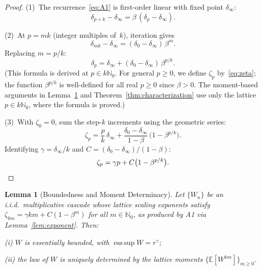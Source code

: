 \documentclass[12pt]{amsart}
\newtheorem{lemma}[theorem]{Lemma}
\theoremstyle{definition}
\theoremstyle{remark}
\DeclareMathOperator*{\esssup}{ess\,sup}
\begin{document}
\begin{proof}
(1)~The recurrence~\eqref{eq:A1} is first-order linear with fixed
point $\delta_\infty$:
\[
  \delta_{p+k} - \delta_\infty = \beta\,(\delta_p - \delta_\infty).
\]

(2)~At $p = mk$ (integer multiples of~$k$), iteration gives
\[
  \delta_{mk} - \delta_\infty
  = (\delta_0 - \delta_\infty)\,\beta^m.
\]
Replacing $m = p/k$:
\[
  \delta_p
  = \delta_\infty + (\delta_0 - \delta_\infty)\,\beta^{p/k}.
\]
(This formula is derived at $p \in k\mathbb{N}_0$.  For general $p
\geq 0$, we define $\zeta_p$ by~\eqref{eq:zeta}; the function
$\beta^{p/k}$ is well-defined for all real $p \geq 0$ since $\beta >
0$.  The moment-based arguments in Lemma~\ref{lem:determinacy} and
Theorem~\ref{thm:characterization} use only the lattice
$p \in k\mathbb{N}_0$, where the formula is proved.)

(3)~With $\zeta_0 = 0$, sum the step-$k$ increments using the
geometric series:
\[
  \zeta_p
  = \frac{p}{k}\,\delta_\infty
    + \frac{\delta_0 - \delta_\infty}{1 - \beta}\,
      \bigl(1 - \beta^{p/k}\bigr).
\]
Identifying $\gamma = \delta_\infty/k$ and $C = (\delta_0 -
\delta_\infty)/(1-\beta)$:
\[
  \zeta_p = \gamma p + C\bigl(1 - \beta^{p/k}\bigr).  \qedhere
\]
\end{proof}


\begin{lemma}[Boundedness and Moment Determinacy]\label{lem:determinacy}
Let $\{W_n\}$ be an i.i.d.\ multiplicative cascade whose lattice
scaling exponents satisfy
$\zeta_{km} = \gamma km + C(1-\beta^{m})$ for all $m \in
\mathbb{N}_0$, as produced by A1 via Lemma~\ref{lem:exponent}.  Then:

\textup{(i)} $W$ is essentially bounded, with $\esssup W =
r^{\gamma}$;

\textup{(ii)} the law of $W$ is uniquely determined by the lattice
moments $\{\mathbb{E}[W^{km}]\}_{m \ge 0}$.
\end{lemma}
\end{document}
